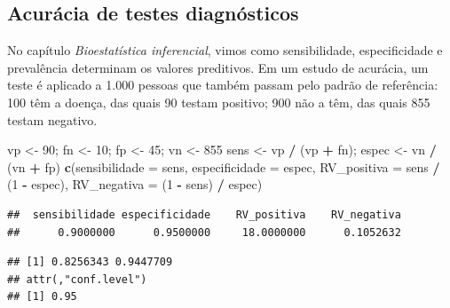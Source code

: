 \documentclass[
]{book}
\newenvironment{Shaded}{\begin{snugshade}}{\end{snugshade}}
\newcommand{\AttributeTok}[1]{\textcolor[rgb]{0.13,0.29,0.53}{#1}}
\newcommand{\CommentTok}[1]{\textcolor[rgb]{0.56,0.35,0.01}{\textit{#1}}}
\newcommand{\ConstantTok}[1]{\textcolor[rgb]{0.56,0.35,0.01}{#1}}
\newcommand{\DecValTok}[1]{\textcolor[rgb]{0.00,0.00,0.81}{#1}}
\newcommand{\FunctionTok}[1]{\textcolor[rgb]{0.13,0.29,0.53}{\textbf{#1}}}
\newcommand{\NormalTok}[1]{#1}
\newcommand{\OtherTok}[1]{\textcolor[rgb]{0.56,0.35,0.01}{#1}}
\newcommand{\SpecialCharTok}[1]{\textcolor[rgb]{0.81,0.36,0.00}{\textbf{#1}}}
\begin{document}
\subsection{Acurácia de testes diagnósticos}\label{acuruxe1cia-de-testes-diagnuxf3sticos}

No capítulo \emph{Bioestatística inferencial}, vimos como sensibilidade, especificidade e prevalência determinam os valores preditivos. Em um estudo de acurácia, um teste é aplicado a 1.000 pessoas que também passam pelo padrão de referência: 100 têm a doença, das quais 90 testam positivo; 900 não a têm, das quais 855 testam negativo.

\begin{Shaded}
\begin{Highlighting}[]
\NormalTok{vp }\OtherTok{\textless{}{-}} \DecValTok{90}\NormalTok{; fn }\OtherTok{\textless{}{-}} \DecValTok{10}\NormalTok{; fp }\OtherTok{\textless{}{-}} \DecValTok{45}\NormalTok{; vn }\OtherTok{\textless{}{-}} \DecValTok{855}
\NormalTok{sens }\OtherTok{\textless{}{-}}\NormalTok{ vp }\SpecialCharTok{/}\NormalTok{ (vp }\SpecialCharTok{+}\NormalTok{ fn); espec }\OtherTok{\textless{}{-}}\NormalTok{ vn }\SpecialCharTok{/}\NormalTok{ (vn }\SpecialCharTok{+}\NormalTok{ fp)}
\FunctionTok{c}\NormalTok{(}\AttributeTok{sensibilidade =}\NormalTok{ sens, }\AttributeTok{especificidade =}\NormalTok{ espec,}
  \AttributeTok{RV\_positiva =}\NormalTok{ sens }\SpecialCharTok{/}\NormalTok{ (}\DecValTok{1} \SpecialCharTok{{-}}\NormalTok{ espec), }\AttributeTok{RV\_negativa =}\NormalTok{ (}\DecValTok{1} \SpecialCharTok{{-}}\NormalTok{ sens) }\SpecialCharTok{/}\NormalTok{ espec)}
\end{Highlighting}
\end{Shaded}

\begin{verbatim}
##  sensibilidade especificidade    RV_positiva    RV_negativa 
##      0.9000000      0.9500000     18.0000000      0.1052632
\end{verbatim}

\begin{Shaded}
\end{Shaded}

\begin{verbatim}
## [1] 0.8256343 0.9447709
## attr(,"conf.level")
## [1] 0.95
\end{verbatim}
\end{document}
